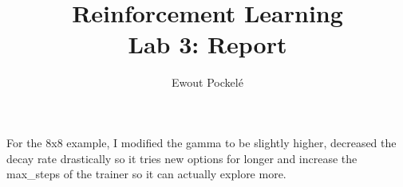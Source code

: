 \documentclass{article}
\title{Reinforcement Learning \\ \Large{Lab 3: Report}}
\author{Ewout Pockelé}
\begin{document}
\maketitle

For the 8x8 example, I modified the gamma to be slightly higher, decreased the decay rate drastically so it tries new options for longer and increase the max\_steps of the trainer so it can actually explore more.
\end{document}

